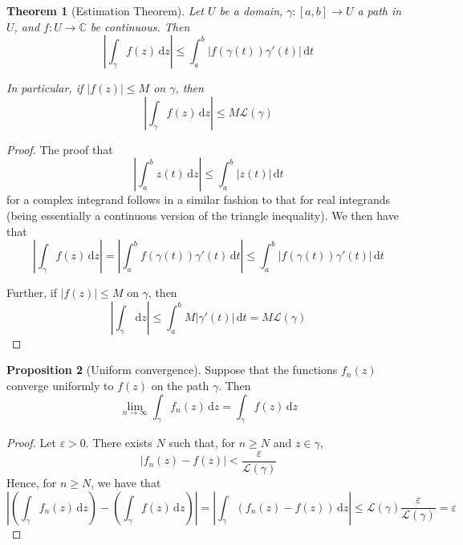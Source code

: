 \documentclass[10pt,fleqn]{article}
\newcommand{\diff}{\,\mathrm{d}}
\newcommand{\comps}{\mathbb{C}}
\newcommand{\eps}{\varepsilon}
\theoremstyle{definition} \newtheorem{defn}{Definition}[section]
\theoremstyle{plain}      \newtheorem{thm}[defn]{Theorem}
\theoremstyle{definition} \newtheorem{prop}[defn]{Proposition}
\theoremstyle{plain}      \newtheorem{lem}[defn]{Lemma}
\theoremstyle{definition} \newtheorem{cor}[defn]{Corollary}
\theoremstyle{definition} \newtheorem{ex}[defn]{Example}
\theoremstyle{definition} \newtheorem{rem}[defn]{Remark}
\begin{document}
\begin{thm}[Estimation Theorem]
    Let $U$ be a domain, $\gamma:[a,b]\to U$ a path in $U$, and $f:U\to\comps$ be continuous.
    Then
    \begin{equation}
        \left|\int_{\gamma} f(z)\diff z\right|\leq
        \int_a^b |f(\gamma(t))\gamma'(t)|\diff t
    \end{equation}

    In particular, if $|f(z)|\leq M$ on $\gamma$, then
    \begin{equation}
        \left|\int_{\gamma} f(z)\diff z\right|\leq
        M\mathcal{L}(\gamma)
    \end{equation}
\end{thm}

\begin{proof}
    The proof that
    \[
        \left|\int_a^b z(t)\diff z\right|\leq
        \int_a^b |z(t)|\diff t
    \]
    for a complex integrand follows in a similar fashion to that for real integrands (being essentially a continuous version of the triangle inequality).
    We then have that
    \[
        \left|\int_{\gamma} f(z)\diff z\right|=
        \left|\int_a^b f(\gamma(t))\gamma'(t)\diff t\right|\leq
        \int_a^b |f(\gamma(t))\gamma'(t)|\diff t
    \]

    Further, if $|f(z)|\leq M$ on $\gamma$, then
    \[
        \left|\int_{\gamma}\diff z\right|\leq
        \int_a^b M|\gamma'(t)|\diff t=
        M\mathcal{L}(\gamma)
    \]
\end{proof}

\begin{prop}[Uniform convergence]
    Suppose that the functions $f_n(z)$ converge uniformly to $f(z)$ on the path $\gamma$.
    Then
    \begin{equation}
        \lim_{n\to\infty}\int_{\gamma} f_n(z)\diff z=
        \int_{\gamma} f(z)\diff z
    \end{equation}
\end{prop}

\begin{proof}
    Let $\eps>0$.
    There exists $N$ such that, for $n\geq N$ and $z\in\gamma$,
    \[
        |f_n(z)-f(z)|<
        \frac{\eps}{\mathcal{L}(\gamma)}
    \]
    Hence, for $n\geq N$, we have that
    \[
        \left|\left(\int_{\gamma} f_n(z)\diff z\right)-\left(\int_{\gamma} f(z)\diff z\right)\right|=
        \left|\int_{\gamma}(f_n(z)-f(z))\diff z\right|\leq
        \mathcal{L}(\gamma)\frac{\eps}{\mathcal{L}(\gamma)}=
        \eps
    \]
\end{proof}
\end{document}
